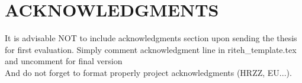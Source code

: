
  \section*{ACKNOWLEDGMENTS}
   \begin{justify}
It is advisable NOT to include acknowledgments section upon sending the thesis for first evaluation. Simply comment acknowledgment line in riteh_template.tex and uncomment for final version\\

And do not forget to format properly project acknowledgments (HRZZ, EU...).


   \end{justify}
